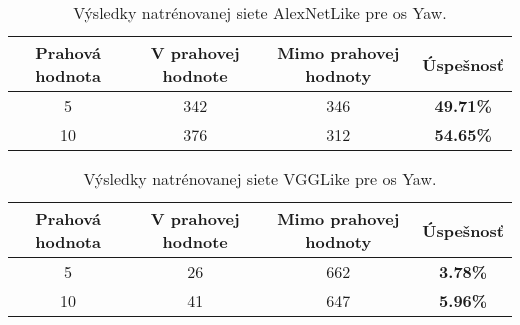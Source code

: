 \begin{table}[H]
    \centering
    \begin{tabular}{|c|c|c|c|}
        \hline
        Prahová hodnota & V prahovej hodnote       & Mimo prahovej hodnoty    & Úspešnosť    \\ \hline
        5               & {\color[HTML]{009901} 342} & {\color[HTML]{9A0000} 346} & \textbf{49.71\%} \\ \hline
        10              & {\color[HTML]{009901} 376} & {\color[HTML]{9A0000} 312} & \textbf{54.65\%} \\ \hline
    \end{tabular}
    \caption{Výsledky natrénovanej siete AlexNetLike pre os Yaw.}
    \label{tab:alexnetyawresults}
\end{table}
\begin{table}[H]
    \centering
    \begin{tabular}{|c|c|c|c|}
        \hline
        Prahová hodnota & V prahovej hodnote       & Mimo prahovej hodnoty    & Úspešnosť    \\ \hline
        5               & {\color[HTML]{009901} 26} & {\color[HTML]{9A0000} 662} & \textbf{3.78\%} \\ \hline
        10              & {\color[HTML]{009901} 41} & {\color[HTML]{9A0000} 647} & \textbf{5.96\%} \\ \hline
    \end{tabular}
    \caption{Výsledky natrénovanej siete VGGLike pre os Yaw.}
    \label{tab:vgglikeyawresults}
\end{table}
